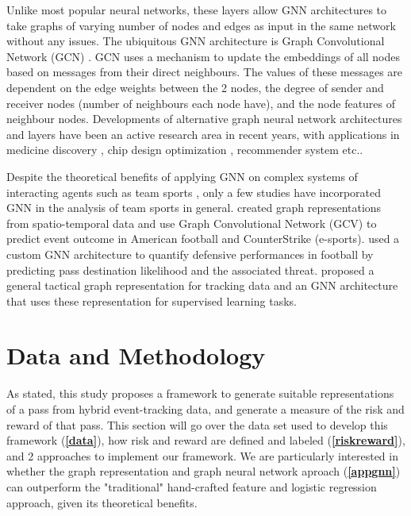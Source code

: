\documentclass[conference]{IEEEtran}
\begin{document}
Unlike most popular neural networks, these layers allow GNN architectures to take graphs of varying number of nodes and edges as input in the same network without any issues. The ubiquitous GNN architecture is Graph Convolutional Network (GCN) \parencite{gcn}. GCN uses a mechanism to update the embeddings of all nodes based on messages from their direct neighbours. The values of these messages are dependent on the edge weights between the 2 nodes, the degree of sender and receiver nodes (number of neighbours each node have), and the node features of neighbour nodes. Developments of alternative graph neural network architectures and layers have been an active research area in recent years, with applications in medicine discovery \parencite{gnndrugs}, chip design optimization \parencite{gnnchip}, recommender system \parencite{gnnrecc} etc.. 

Despite the theoretical benefits of applying GNN on complex systems of interacting agents such as team sports \parencite{gnnbias, kipf2018neural, gnn_framework}, only a few studies have incorporated GNN in the analysis of team sports in general. \textcite{gnn_overall} created graph representations from spatio-temporal data and use Graph Convolutional Network (GCV) to predict event outcome in American football and CounterStrike (e-sports). \textcite{GNNPaulPower} used a custom GNN architecture to quantify defensive performances in football by predicting pass destination likelihood and the associated threat. \textcite{gnn_framework} proposed a general tactical graph representation for tracking data and an GNN architecture that uses these representation for supervised learning tasks.










\section{Data and Methodology}
As stated, this study proposes a framework to generate suitable representations of a pass from hybrid event-tracking data, and generate a measure of the risk and reward of that pass. This section will go over the data set used to develop this framework (\textbf{\ref{data}}), how risk and reward are defined and labeled (\textbf{\ref{riskreward}}), and 2 approaches to implement our framework. We are particularly interested in whether the graph representation and graph neural network aproach (\textbf{\ref{appgnn}}) can outperform the "traditional" hand-crafted feature and logistic regression approach, given its theoretical benefits.
\end{document}

